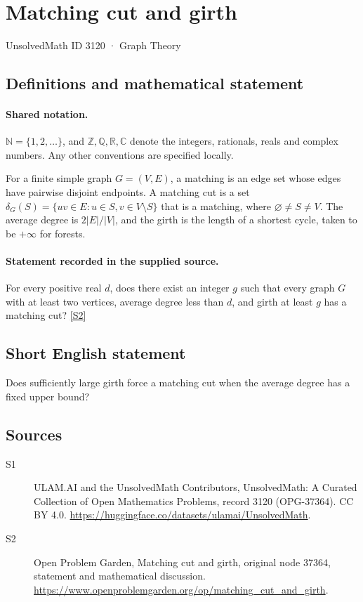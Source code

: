 \documentclass[11pt]{article}
\newcommand{\sref}[2]{\hyperlink{source:#1:#2}{[S#2]}}
\begin{document}
\setcounter{section}{3119}
\section{Matching cut and girth}\label{3120}
{\small\sffamily UnsolvedMath ID 3120 · Graph Theory}
\subsection{Definitions and mathematical statement}

\paragraph{Shared notation.}$\mathbb N=\{1,2,\ldots\}$, and $\mathbb Z,\mathbb Q,\mathbb R,\mathbb C$ denote the integers, rationals, reals and complex numbers. Any other conventions are specified locally.


For a finite simple graph $G=(V,E)$, a matching is an edge set whose edges have pairwise disjoint endpoints. A matching cut is a set $\delta_G(S)=\{uv\in E:u\in S,v\in V\setminus S\}$ that is a matching, where $\varnothing\ne S\ne V$. The average degree is $2|E|/|V|$, and the girth is the length of a shortest cycle, taken to be $+\infty$ for forests.
\paragraph{Statement recorded in the supplied source.}
For every positive real $d$, does there exist an integer $g$ such that every graph $G$ with at least two vertices, average degree less than $d$, and girth at least $g$ has a matching cut? \sref{3120}{2}
\subsection{Short English statement}
Does sufficiently large girth force a matching cut when the average degree has a fixed upper bound?
\subsection{Sources}
\begin{description}
\item[\hypertarget{source:3120:1}{S1}] ULAM.AI and the UnsolvedMath Contributors, UnsolvedMath: A Curated Collection of Open Mathematics Problems, record 3120 (OPG-37364). CC BY 4.0. \url{https://huggingface.co/datasets/ulamai/UnsolvedMath}.
\item[\hypertarget{source:3120:2}{S2}] Open Problem Garden, Matching cut and girth, original node 37364, statement and mathematical discussion. \url{https://www.openproblemgarden.org/op/matching_cut_and_girth}.
\end{description}
\label{end:3120}
\end{document}
